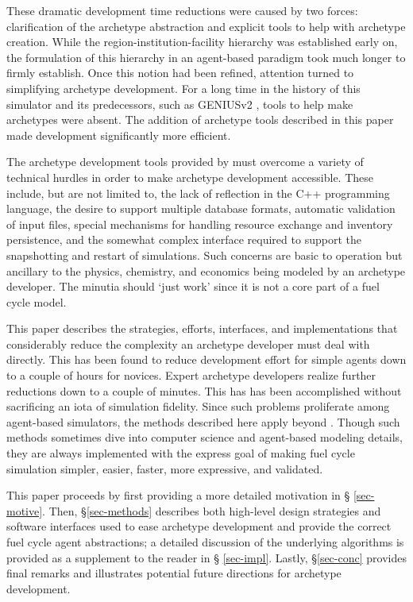 These dramatic development time reductions were caused by two forces:
clarification of the archetype abstraction and explicit tools to help with 
archetype creation. While the region-institution-facility hierarchy was established 
early on, the formulation of this hierarchy in an agent-based paradigm took much 
longer to firmly establish.  Once this notion had been refined, attention turned to 
simplifying \Cyclus archetype development.
For a long time in the history of this simulator and its predecessors, such as 
\gls{GENIUSv2} \cite{oliver_studying_2009}, tools to help make archetypes were 
absent.
The addition of archetype tools described in this paper made development significantly more efficient.

The archetype development tools provided by \cyclus must overcome a variety of 
technical hurdles in order to make archetype development accessible.  These 
include, but are not limited to, the lack of reflection in the C++ programming language,
the desire to support multiple database formats, automatic validation of input files,
special mechanisms for handling resource exchange and inventory persistence, 
and the somewhat complex interface required to support the snapshotting and 
restart of simulations. Such concerns are basic to \cyclus operation but 
ancillary to the physics, chemistry, and economics being modeled by an 
archetype developer.
The minutia should `just work' since it is not a core part of a fuel cycle model.

This paper describes the strategies, efforts, interfaces,
and implementations that considerably reduce the complexity  
an archetype developer must deal with directly. This has been 
found to reduce development effort for simple agents down to a couple 
of hours for novices. Expert archetype developers realize further 
reductions down to a couple of minutes. This has has been accomplished 
without sacrificing an iota of simulation fidelity. Since such 
problems proliferate among agent-based simulators, the methods described here apply beyond \cyclus.
Though such methods sometimes dive into 
computer science and agent-based modeling details, they are always implemented
with the express goal of making fuel cycle simulation 
simpler, easier, faster, more expressive, and validated.

This paper proceeds by first providing a more detailed motivation in \S
\ref{sec-motive}. Then, \S \ref{sec-methods} describes both high-level design
strategies and software interfaces used to ease archetype development and
provide the correct fuel cycle agent abstractions; a detailed discussion of the
underlying algorithms is provided as a supplement to the reader in \S
\ref{sec-impl}.  Lastly, \S \ref{sec-conc} provides final remarks and
illustrates potential future directions for \cyclus archetype development.
